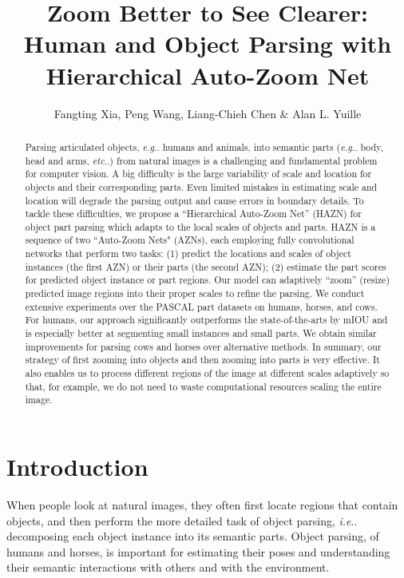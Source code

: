 \documentclass[runningheads]{llncs}
\makeatletter
\DeclareRobustCommand\onedot{\futurelet\@let@token\@onedot}
\def\@onedot{\ifx\@let@token.\else.\null\fi\xspace}
\def\eg{\emph{e.g}\onedot} \def\Eg{\emph{E.g}\onedot}
\def\ie{\emph{i.e}\onedot} \def\Ie{\emph{I.e}\onedot}
\def\etc{\emph{etc}\onedot} \def\vs{\emph{vs}\onedot}
\makeatother
\begin{document}
\pagestyle{headings}
\mainmatter
\def\ECCV16SubNumber{0000}  

\title{Zoom Better to See Clearer: Human and Object Parsing with Hierarchical Auto-Zoom Net}
\author{Fangting Xia, Peng Wang, Liang-Chieh Chen \& Alan L. Yuille}
\maketitle
\begin{abstract}
Parsing articulated objects, \eg humans and animals, into semantic parts (\eg body, head and arms, \etc) from natural images is a challenging and fundamental problem for computer vision. A big difficulty is the large variability of scale and location for objects and their corresponding parts. Even limited mistakes in estimating scale and location will degrade the parsing output and cause errors in boundary details. To tackle these difficulties,  we propose a ``Hierarchical Auto-Zoom Net'' (HAZN) for object part parsing which adapts to the local scales of objects and parts. HAZN is a sequence of two ``Auto-Zoom Nets" (AZNs), each employing fully convolutional networks that perform two tasks: (1) predict the locations and scales of object instances (the first AZN) or their parts (the second AZN); (2) estimate the part scores for predicted object instance or part regions. Our model can adaptively ``zoom'' (resize) predicted image regions into their proper scales to refine the parsing. We conduct extensive experiments over the PASCAL part datasets on humans, horses, and cows. For humans, our approach significantly outperforms the state-of-the-arts by  mIOU and is especially better at segmenting small instances and small parts. We obtain similar improvements for parsing cows and horses over alternative methods. In summary, our strategy of first zooming into objects and then zooming into parts is very effective. It also enables us to process different regions of the image at different scales adaptively so that, for example, we do not need to waste computational resources scaling the entire image.
\end{abstract}

\section{Introduction}
When people look at natural images, they often first locate regions that contain objects, and then perform the more detailed task of object parsing, \ie decomposing each object instance into its semantic parts. Object parsing, of humans and horses, is important for estimating their poses and understanding their semantic interactions with others and with the environment.
\end{document}
